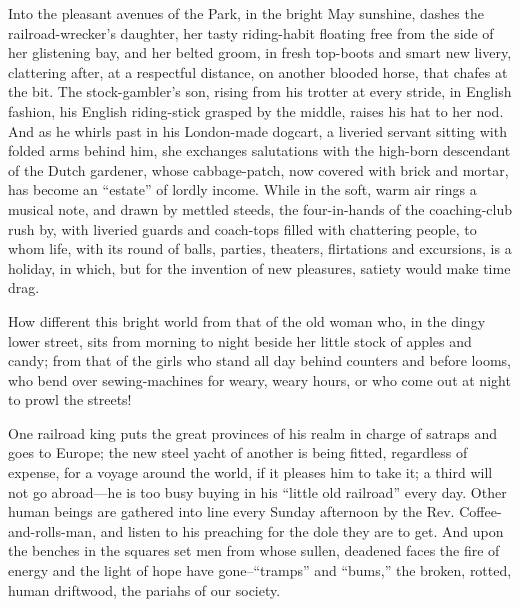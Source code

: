 \documentclass{book}
\begin{document}
Into the pleasant avenues of the Park, in the bright May sunshine, dashes the railroad-wrecker’s daughter, her tasty riding-habit floating free from the side of her glistening bay, and her belted groom, in fresh top-boots and smart new livery, clattering after, at a respectful distance, on another blooded horse, that chafes at the bit. The stock-gambler’s son, rising from his trotter at every stride, in English fashion, his English riding-stick grasped by the middle, raises his hat to her nod. And as he whirls past in his London-made dogcart, a liveried servant sitting with folded arms behind him, she exchanges salutations with the high-born descendant of the Dutch gardener, whose cabbage-patch, now covered with brick and mortar, has become an “estate” of lordly income. While in the soft, warm air rings a musical note, and drawn by mettled steeds, the four-in-hands of the coaching-club rush by, with liveried guards and coach-tops filled with chattering people, to whom life, with its round of balls, parties, theaters, flirtations and excursions, is a holiday, in which, but for the invention of new pleasures, satiety would make time drag.

How different this bright world from that of the old woman who, in the dingy lower street, sits from morning to night beside her little stock of apples and candy; from that of the girls who stand all day behind counters and before looms, who bend over sewing-machines for weary, weary hours, or who come out at night to prowl the streets!

One railroad king puts the great provinces of his realm in charge of satraps and goes to Europe; the new steel yacht of another is being fitted, regardless of expense, for a voyage around the world, if it pleases him to take it; a third will not go abroad—he is too busy buying in his “little old railroad” every day. Other human beings are gathered into line every Sunday afternoon by the Rev. Coffee-and-rolls-man, and listen to his preaching for the dole they are to get. And upon the benches in the squares set men from whose sullen, deadened faces the fire of energy and the light of hope have gone–“tramps” and “bums,” the broken, rotted, human driftwood, the pariahs of our society.
\end{document}
